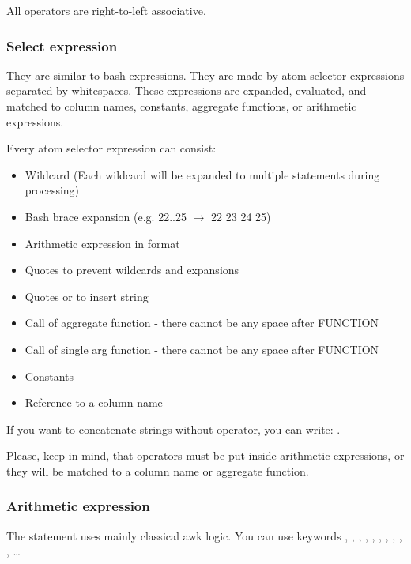All operators are right-to-left associative.

\subsubsection{Select expression}
They are similar to bash expressions\cite{bash-reference-manual}. They are made by atom selector expressions separated by whitespaces. These expressions are expanded, evaluated, and matched to column names, constants, aggregate functions, or arithmetic expressions.

Every atom selector expression can consist:
\begin{itemize}
    \item Wildcard (Each wildcard will be expanded to multiple statements during processing)
    \item Bash brace expansion (e.g. {22..25} $\rightarrow$ 22 23 24 25) \cite{bash-reference-manual}
    \item Arithmetic expression in  format
    \item Quotes  to prevent wildcards and expansions
    \item Quotes  or  to insert string
    \item Call of aggregate function  - there cannot be any space after FUNCTION
    \item Call of single arg function  - there cannot be any space after FUNCTION
    \item Constants
    \item Reference to a column name
\end{itemize}

If you want to concatenate strings without \icode{++} operator, you can write: \break{}.

Please, keep in mind, that operators must be put inside arithmetic expressions, or they will be matched to a column name or aggregate function.

\subsubsection{Arithmetic expression}
The statement uses mainly classical awk logic.\cite{awk-reference-manual} 
You can use keywords \icode{\textgreater}, \icode{\textless}, \icode{\textless=}, \icode{\textgreater=}, \icode{==}, \icode{$\vert\vert$}, \icode{\&\&}, \icode{+}, \icode{-}, \icode{*}, \icode{/}\ldots

